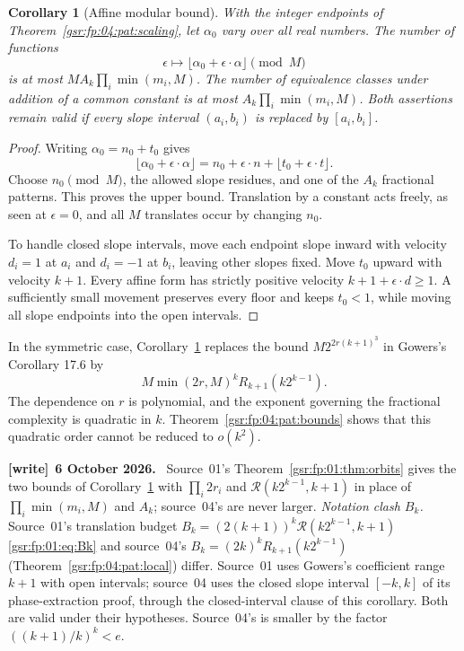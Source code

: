 \documentclass[11pt,letterpaper]{article}
\numberwithin{equation}{section}
\newtheorem{corollary}[theorem]{Corollary}
\theoremstyle{definition}
\theoremstyle{remark}
\newcommand{\1}{\mathbf 1}
\newenvironment{writenote}[1][]{\par\smallskip\begingroup\small
 \noindent\textbf{[write]}\if\relax\detokenize{#1}\relax\else~\textbf{#1.}\fi\ }%
 {\par\endgroup\smallskip}
\begin{document}
\begin{corollary}[Affine modular bound]\label{gsr:fp:04:pat:affine}
With the integer endpoints of Theorem~\ref{gsr:fp:04:pat:scaling}, let
$\alpha_0$ vary over all real numbers. The number of functions
\[
 \epsilon\longmapsto
 \lfloor\alpha_0+\epsilon\cdot\alpha\rfloor\pmod M
\]
is at most $M A_k\prod_i\min(m_i,M)$. The number of equivalence classes
under addition of a common constant is at most
$A_k\prod_i\min(m_i,M)$. Both assertions remain valid if every
slope interval $(a_i,b_i)$ is replaced by $[a_i,b_i]$.
\end{corollary}
\begin{proof}
Writing $\alpha_0=n_0+t_0$ gives
\[
 \lfloor\alpha_0+\epsilon\cdot\alpha\rfloor
  =n_0+\epsilon\cdot n+\lfloor t_0+\epsilon\cdot t\rfloor.
\]
Choose $n_0\pmod M$, the allowed slope residues, and one of the $A_k$
fractional patterns. This proves the upper bound. Translation by a
constant acts freely, as seen at $\epsilon=0$, and all $M$ translates
occur by changing $n_0$.

To handle closed slope intervals, move each endpoint slope inward with
velocity $d_i=1$ at $a_i$ and $d_i=-1$ at $b_i$, leaving other slopes
fixed. Move $t_0$ upward with velocity $k+1$. Every affine form has
strictly positive velocity $k+1+\epsilon\cdot d\ge1$. A sufficiently
small movement preserves every floor and keeps $t_0<1$, while moving
all slope endpoints into the open intervals.
\end{proof}

In the symmetric case, Corollary~\ref{gsr:fp:04:pat:affine} replaces the bound
$M2^{2r(k+1)^3}$ in Gowers's Corollary 17.6 by
\[
 M\min(2r,M)^k R_{k+1}(k2^{k-1}).
\]
The dependence on $r$ is polynomial, and the exponent governing the
fractional complexity is quadratic in $k$. Theorem~\ref{gsr:fp:04:pat:bounds}
shows that this quadratic order cannot be reduced to $o(k^2)$.
\begin{writenote}[6 October 2026]
Source~01's Theorem~\ref{gsr:fp:01:thm:orbits} gives the two bounds of Corollary~\ref{gsr:fp:04:pat:affine} with $\prod_i2r_i$ and $\mathcal R(k2^{k-1},k+1)$ in place of $\prod_i\min(m_i,M)$ and $A_k$; source~04's are never larger. \emph{Notation clash $B_k$.} Source~01's translation budget $B_k=(2(k+1))^k\mathcal R(k2^{k-1},k+1)$ \eqref{gsr:fp:01:eq:Bk} and source~04's $B_k=(2k)^kR_{k+1}(k2^{k-1})$ (Theorem~\ref{gsr:fp:04:pat:local}) differ. Source~01 uses Gowers's coefficient range $k+1$ with open intervals; source~04 uses the closed slope interval $[-k,k]$ of its phase-extraction proof, through the closed-interval clause of this corollary. Both are valid under their hypotheses. Source~04's is smaller by the factor $((k+1)/k)^k<e$.
\end{writenote}
\end{document}
